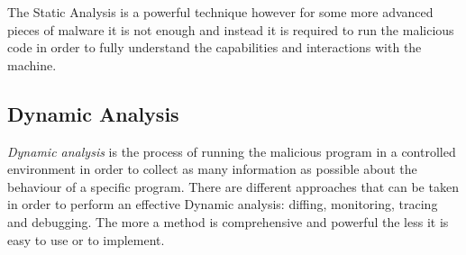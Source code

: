 The Static Analysis is a powerful technique however for some more advanced pieces of malware it is not enough and instead it is required to run the malicious code in order to fully understand the capabilities and interactions with the machine.

\subsection*{Dynamic Analysis}


\textit{Dynamic analysis} is the process of running the malicious program in a controlled environment in order to collect as many information as possible about the behaviour of a specific program. There are different approaches that can be taken in order to perform an effective Dynamic analysis: diffing, monitoring, tracing and debugging. The more a method is comprehensive and powerful the less it is easy to use or to implement.

